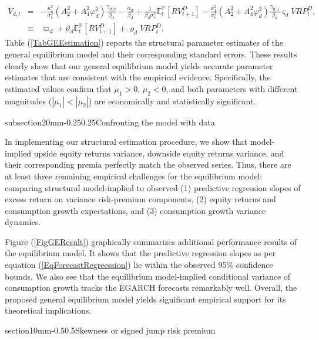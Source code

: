 \documentclass[11pt]{article}
\makeatletter
\renewcommand\subsection{\@startsection%
    {subsection}{2}{0mm}{-0.25\baselineskip}{0.25\baselineskip}{\bfseries\large}}
\renewcommand\section{\@startsection%
    {section}{1}{0mm}{-0.5\baselineskip}{0.5\baselineskip}{\bfseries\Large}}
\makeatother
\begin{document}
\begin{eqnarray*}
V_{d,t} &=&-\frac{\kappa _{1}^{2}}{\sigma _{c}^{2}}\left(
A_{2}^{2}+A_{4}^{2}\varphi _{d}^{2}\right) \frac{\gamma _{d,0}}{\beta _{d}}-%
\frac{\alpha _{d}}{\beta _{d}}+\frac{1}{\beta _{d}\sigma _{c}^{2}}\mathbb{E}_{t}^{\mathbb{P}}[RV_{t+1}^{D}]-\frac{\kappa
_{1}^{2}}{\sigma _{c}^{2}}\left( A_{2}^{2}+A_{4}^{2}\varphi _{d}^{2}\right)
\frac{\gamma _{d,1}}{\beta _{d}}\varsigma _{d}VRP_{t}^{D}, \\
&\equiv &\varpi _{d}+\vartheta _{d}\mathbb{E}_{t}^{\mathbb{P}}[RV_{t+1}^{D}]+\varrho_{d}VRP_{t}^{D}.
\end{eqnarray*}
Table (\ref{TabGEEstimation}) reports the structural parameter estimates of the general equilibrium model and their corresponding standard errors. These results clearly show that our general equilibrium model yields accurate parameter estimates that are consistent with the empirical evidence. Specifically, the estimated values confirm that $\mu_1 > 0$, $\mu_2 < 0$, and both parameters with different magnitudes ($|\mu_1| < |\mu_2|$) are economically and statistically significant.


\subsection{Confronting the model with data}\label{SecEstimatingStructuralModel}

In implementing our structural estimation procedure, we show that model-implied upside equity returns variance, downside equity returns variance, and their corresponding premia perfectly match the observed series. Thus, there are at least three remaining empirical challenges for the equilibrium model: comparing structural model-implied to observed  (1) predictive regression slopes of excess return on variance risk-premium components, (2) equity returns and consumption growth expectations, and (3) consumption growth variance dynamics.

Figure (\ref{FigGEResult}) graphically summarizes additional performance results of the equilibrium model. It shows that the predictive regression slopes as per equation (\ref{EqForecastRegreession}) lie within the observed 95\% confidence bounds. We also see that the equilibrium model-implied conditional variance of consumption growth tracks the EGARCH forecasts remarkably well. Overall, the proposed general equilibrium model yields significant empirical support for its theoretical implications.

\section{Skewness or signed jump risk premium}\label{SecSkewPremDec}
\end{document}
